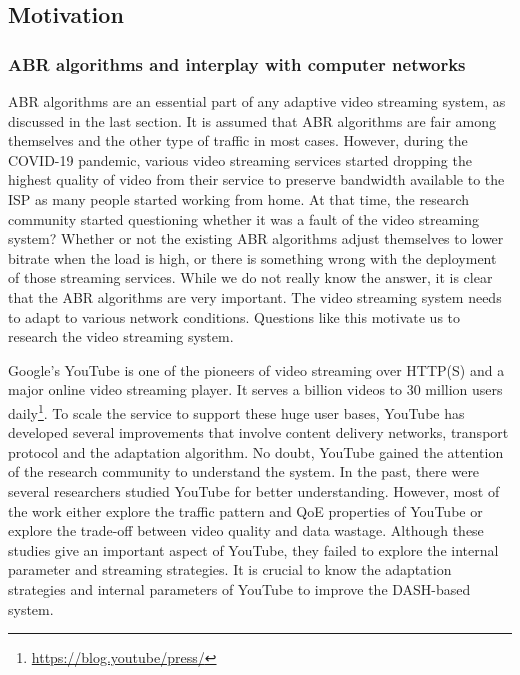 \subsection{Motivation}
\subsubsection{ABR algorithms and interplay with computer networks}
ABR algorithms are an essential part of any adaptive video streaming system, as discussed in the last section. It is assumed that ABR algorithms are fair among themselves and the other type of traffic in most cases. However, during the COVID-19 pandemic, various video streaming services started dropping the highest quality of video from their service to preserve bandwidth available to the ISP as many people started working from home. At that time, the research community started questioning whether it was a fault of the video streaming system? Whether or not the existing ABR algorithms adjust themselves to lower bitrate when the load is high, or there is something wrong with the deployment of those streaming services. While we do not really know the answer, it is clear that the ABR algorithms are very important. The video streaming system needs to adapt to various network conditions. Questions like this motivate us to research the video streaming system.

Google's YouTube is one of the pioneers of video streaming over HTTP(S) and a major online video streaming player. It serves a billion videos to 30 million users daily\footnote{\url{https://blog.youtube/press/}}. To scale the service to support these huge user bases, YouTube has developed several improvements that involve content delivery networks, transport protocol and the adaptation algorithm. No doubt, YouTube gained the attention of the research community to understand the system. In the past, there were several researchers studied YouTube for better understanding. However, most of the work either explore the traffic pattern and QoE properties of YouTube\cite{gill2007youtube,krishnappa2013dashing,wamser2016modeling,wamser2015poster,6757893ieeeexp,7129790ieeeexp} or explore the trade-off between video quality and data wastage\cite{sieber2015cost,seufert2015youtube,sieber2016sacrificing}. Although these studies give an important aspect of YouTube, they failed to explore the internal parameter and streaming strategies. It is crucial to know the adaptation strategies and internal parameters of YouTube to improve the DASH-based system.


